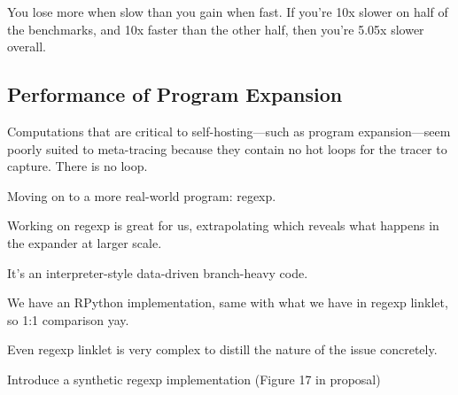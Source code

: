 			\begin{paragraph-here}
				You lose more when slow than you gain when fast. If you're 10x slower on half of the benchmarks, and 10x faster than the other half, then you're 5.05x slower overall.
			\end{paragraph-here}

		\subsection{Performance of Program Expansion}

			\begin{sectionpoint}
				Computations that are critical to self-hosting—such as program expansion—seem poorly suited to meta-tracing because they contain no hot loops for the tracer to capture. There is no loop.

			\end{sectionpoint}

			\begin{paragraph-here}
				Moving on to a more real-world program: regexp.
			\end{paragraph-here}

			\begin{paragraph-here}
				Working on regexp is great for us, extrapolating which reveals what happens in the expander at larger scale.
			\end{paragraph-here}


			\begin{paragraph-here}
				It's an interpreter-style data-driven branch-heavy code.
			\end{paragraph-here}


			\begin{paragraph-here}
				We have an RPython implementation, same with what we have in regexp linklet, so 1:1 comparison yay.

				Even regexp linklet is very complex to distill the nature of the issue concretely.
			\end{paragraph-here}


			\begin{paragraph-here}
				Introduce a synthetic regexp implementation (Figure 17 in proposal)
			\end{paragraph-here}


